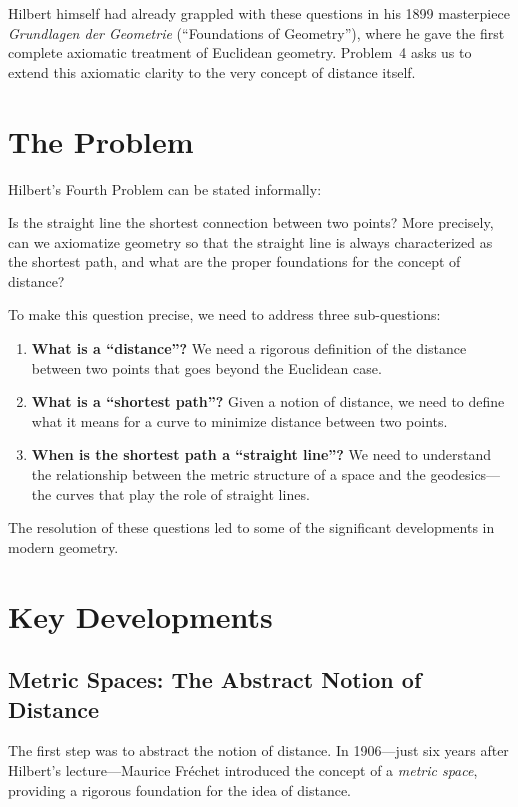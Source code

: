 Hilbert himself had already grappled with these questions in his 1899 masterpiece \emph{Grundlagen der Geometrie} (``Foundations of Geometry''), where he gave the first complete axiomatic treatment of Euclidean geometry. Problem~4 asks us to extend this axiomatic clarity to the very concept of distance itself.

\section{The Problem}

Hilbert's Fourth Problem can be stated informally:

\begin{problem_statement}
Is the straight line the shortest connection between two points? More precisely, can we axiomatize geometry so that the straight line is always characterized as the shortest path, and what are the proper foundations for the concept of distance?
\end{problem_statement}

To make this question precise, we need to address three sub-questions:
\begin{enumerate}
    \item \textbf{What is a ``distance''?} We need a rigorous definition of the distance between two points that goes beyond the Euclidean case.
    \item \textbf{What is a ``shortest path''?} Given a notion of distance, we need to define what it means for a curve to minimize distance between two points.
    \item \textbf{When is the shortest path a ``straight line''?} We need to understand the relationship between the metric structure of a space and the geodesics---the curves that play the role of straight lines.
\end{enumerate}
The resolution of these questions led to some of the significant developments in modern geometry.

\section{Key Developments}

\subsection{Metric Spaces: The Abstract Notion of Distance}

The first step was to abstract the notion of distance. In 1906---just six years after Hilbert's lecture---Maurice Fr\'echet introduced the concept of a \emph{metric space}, providing a rigorous foundation for the idea of distance.

